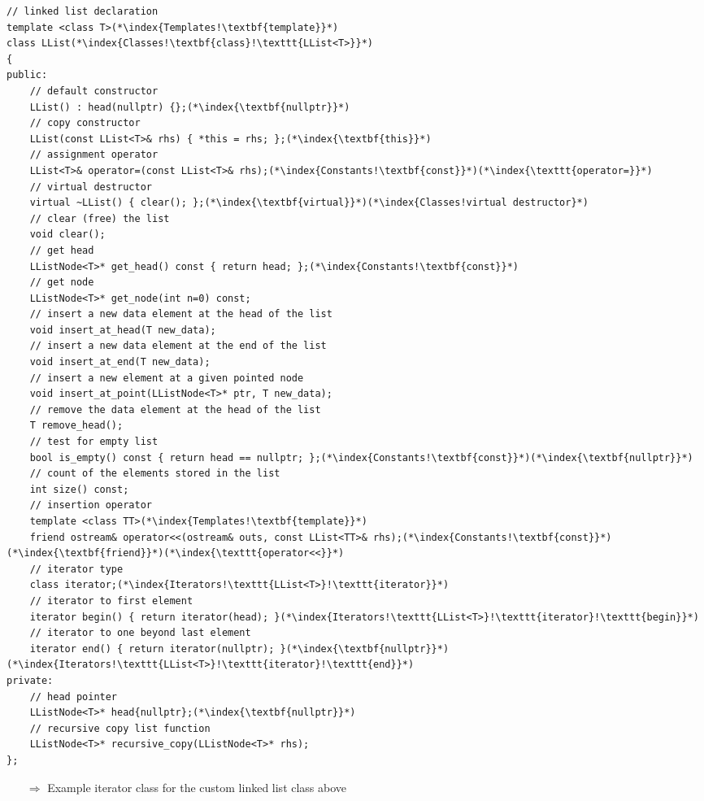 \documentclass[10pt]{article}
\begin{document}
\begin{lstlisting}
// linked list declaration
template <class T>(*\index{Templates!\textbf{template}}*)
class LList(*\index{Classes!\textbf{class}!\texttt{LList<T>}}*)
{
public:
    // default constructor
    LList() : head(nullptr) {};(*\index{\textbf{nullptr}}*)
    // copy constructor
    LList(const LList<T>& rhs) { *this = rhs; };(*\index{\textbf{this}}*)
    // assignment operator
    LList<T>& operator=(const LList<T>& rhs);(*\index{Constants!\textbf{const}}*)(*\index{\texttt{operator=}}*)
    // virtual destructor
    virtual ~LList() { clear(); };(*\index{\textbf{virtual}}*)(*\index{Classes!virtual destructor}*)
    // clear (free) the list
    void clear();
    // get head
    LListNode<T>* get_head() const { return head; };(*\index{Constants!\textbf{const}}*)
    // get node
    LListNode<T>* get_node(int n=0) const;
    // insert a new data element at the head of the list
    void insert_at_head(T new_data);
    // insert a new data element at the end of the list
    void insert_at_end(T new_data);
    // insert a new element at a given pointed node
    void insert_at_point(LListNode<T>* ptr, T new_data);
    // remove the data element at the head of the list
    T remove_head();
    // test for empty list
    bool is_empty() const { return head == nullptr; };(*\index{Constants!\textbf{const}}*)(*\index{\textbf{nullptr}}*)
    // count of the elements stored in the list
    int size() const;
    // insertion operator
    template <class TT>(*\index{Templates!\textbf{template}}*)
    friend ostream& operator<<(ostream& outs, const LList<TT>& rhs);(*\index{Constants!\textbf{const}}*)(*\index{\textbf{friend}}*)(*\index{\texttt{operator<<}}*)
    // iterator type
    class iterator;(*\index{Iterators!\texttt{LList<T>}!\texttt{iterator}}*)
    // iterator to first element
    iterator begin() { return iterator(head); }(*\index{Iterators!\texttt{LList<T>}!\texttt{iterator}!\texttt{begin}}*)
    // iterator to one beyond last element
    iterator end() { return iterator(nullptr); }(*\index{\textbf{nullptr}}*)(*\index{Iterators!\texttt{LList<T>}!\texttt{iterator}!\texttt{end}}*)
private:
    // head pointer
    LListNode<T>* head{nullptr};(*\index{\textbf{nullptr}}*)
    // recursive copy list function
    LListNode<T>* recursive_copy(LListNode<T>* rhs);
};
\end{lstlisting}
\begin{enumerate}
\item[$\Rightarrow$] Example iterator class for the custom linked list class above
\end{enumerate}
\end{document}
